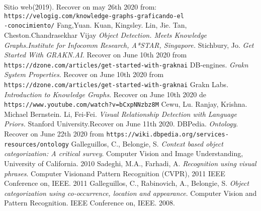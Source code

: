 \begin{thebibliography}{00}
{  Sitio web(2019)}.
  Recover on  may 26th 2020 from:
  \texttt{https://velogig.com/knowledge-graphs-graficando-el\\-conocimiento/}
  Fang,Yuan. Kuan, Kingsley. Lin, Jie. Tan, Cheston.Chandrasekhar Vijay
  \textit{Object Detection. Meets Knowledge Graphs.Institute for Infocomm
  Research, A*STAR, Singapore.}
  Stichbury, Jo. \textit{Get Started With GRAKN.AI}. Recover on  June 10th 
  2020 from
  \texttt{https://dzone.com/articles/get-started-with-graknai}
  DB-engines. \textit{Grakn System Properties}. Recover on  June 10th 
  2020 from \texttt{https://dzone.com/articles/get-started-with-graknai}
  Grakn Labs. \textit{Introduction to Knowledge Graphs}. Recover on June
  10th 2020 de \texttt{https://www.youtube.com/watch?v=bCxpNNzbz8M}
  Cewu, Lu. Ranjay,   Krishna. Michael Bernstein. Li, Fei-Fei.
  \textit{Visual Relationship Detection with Language Priors.}
  Stanford University.Recover on June 11th 2020.
  DBPedia. \textit{Ontology}. Recover on  June  22th 2020 from
  \texttt{https://wiki.dbpedia.org/services-resources/ontology}  
  Galleguillos, C., Belongie, S. \textit{Context based object categorization: 
  A critical survey}. 
   Computer Vision and Image Understanding, University of California. 2010
  Sadeghi, M.A., Farhadi, A. \textit{Recognition using visual phrases}. 
  Computer Visionand Pattern Recognition (CVPR), 2011 IEEE Conference on, 
  IEEE. 2011 
   Galleguillos,  C.,  Rabinovich,  A.,  Belongie,  S. \textit{Object  
   categorization  using  co-occurrence, location and appearance}.
   Computer Vision and Pattern Recognition. IEEE Conference on, IEEE. 2008.
\end{thebibliography}

